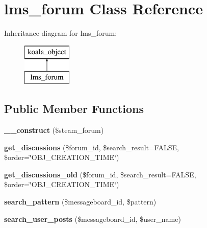 \hypertarget{classlms__forum}{
\section{lms\_\-forum Class Reference}
\label{classlms__forum}
}
Inheritance diagram for lms\_\-forum:\begin{figure}[H]
\begin{center}
\leavevmode
\includegraphics[height=2.000000cm]{classlms__forum}
\end{center}
\end{figure}
\subsection*{Public Member Functions}
\begin{DoxyCompactItemize}
\item 
\hypertarget{classlms__forum_a6682c6685fe5e6ec53c4a80c8483cb15}{
{\bfseries \_\-\_\-construct} (\$steam\_\-forum)}
\label{classlms__forum_a6682c6685fe5e6ec53c4a80c8483cb15}

\item 
\hypertarget{classlms__forum_a7a810795897bb475eee48edf64d10685}{
{\bfseries get\_\-discussions} (\$forum\_\-id, \$search\_\-result=FALSE, \$order=\char`\"{}OBJ\_\-CREATION\_\-TIME\char`\"{})}
\label{classlms__forum_a7a810795897bb475eee48edf64d10685}

\item 
\hypertarget{classlms__forum_a1063e5cbc4e8458ac8046263b8ac6702}{
{\bfseries get\_\-discussions\_\-old} (\$forum\_\-id, \$search\_\-result=FALSE, \$order=\char`\"{}OBJ\_\-CREATION\_\-TIME\char`\"{})}
\label{classlms__forum_a1063e5cbc4e8458ac8046263b8ac6702}

\item 
\hypertarget{classlms__forum_a1c068419627102206309054938a697e7}{
{\bfseries search\_\-pattern} (\$messageboard\_\-id, \$pattern)}
\label{classlms__forum_a1c068419627102206309054938a697e7}

\item 
\hypertarget{classlms__forum_a65a6e31d0396faa2f3c25780833a1c98}{
{\bfseries search\_\-user\_\-posts} (\$messageboard\_\-id, \$user\_\-name)}
\label{classlms__forum_a65a6e31d0396faa2f3c25780833a1c98}

\end{DoxyCompactItemize}
